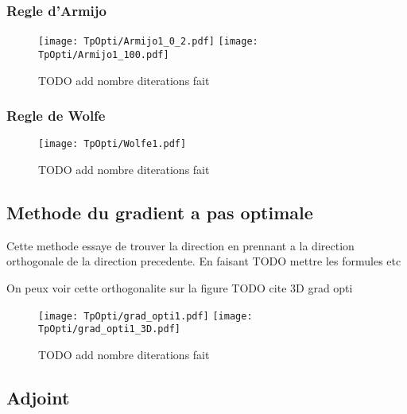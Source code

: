 \subsubsection{Regle d'Armijo}
\begin{figure}[H]
    \centering
    \texttt{[image: TpOpti/Armijo1\_0\_2.pdf]}
    \texttt{[image: TpOpti/Armijo1\_100.pdf]}
    \caption{TODO add nombre diterations fait}
\end{figure}

\subsubsection{Regle de Wolfe}
\begin{figure}[H]
    \centering
    \texttt{[image: TpOpti/Wolfe1.pdf]}
    \caption{TODO add nombre diterations fait}
\end{figure}

\subsection{Methode du gradient a pas optimale}
Cette methode essaye de trouver la direction en prennant a la direction orthogonale de la direction precedente. En faisant TODO mettre les formules etc 

On peux voir cette orthogonalite sur la figure TODO cite 3D grad opti

\begin{figure}[H]
    \centering
    \texttt{[image: TpOpti/grad\_opti1.pdf]}
    \texttt{[image: TpOpti/grad\_opti1\_3D.pdf]}  
    \caption{TODO add nombre diterations fait}
\end{figure}
\subsection{Adjoint}

